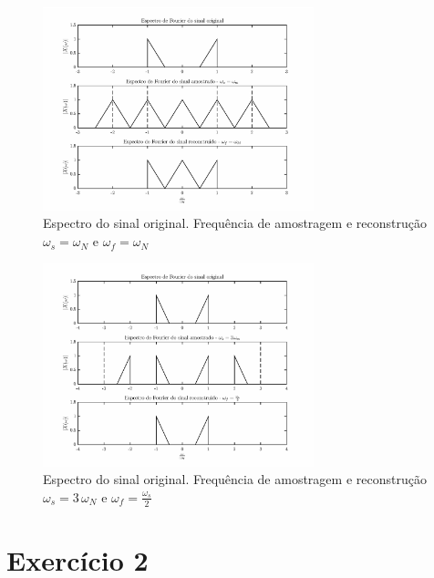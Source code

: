 \documentclass[twoside, fleqn]{article}
\begin{document}
\begin{enumerate}
            \begin{figure}[H]
                \centering
                \includegraphics[width=0.7\textwidth]{./images/ex1d1.eps}
                \caption{Espectro do sinal original. Frequência de amostragem e reconstrução $\omega_s = \omega_N$ e $\omega_f = \omega_N$}
                \label{fig:ex1d1}
            \end{figure}%
        
            \begin{figure}[H]
                \centering
                \includegraphics[width=0.7\textwidth]{./images/ex1d2.eps}
                \caption{Espectro do sinal original. Frequência de amostragem e reconstrução $\omega_s = 3 \, \omega_N$ e $\omega_f = \frac{\omega_s}{2}$}
                \label{fig:ex1d2}
            \end{figure}
    
    \end{enumerate}

\section*{Exercício 2}
\end{document}
